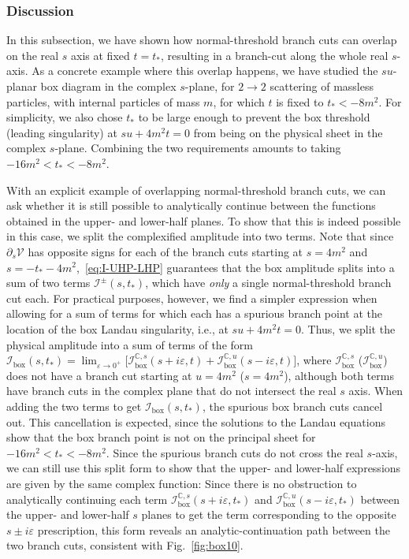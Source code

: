 \documentclass[12pt]{article}
\numberwithin{figure}{section}
\def \C {\mathbb{C}}
\def \eps {\varepsilon}
\def \V {\mathcal{V}}
\def \I {\mathcal{I}}
\def \boxx {\mathrm{box}}
\begin{document}
    \subsubsection{Discussion}
	
	In this subsection, we have shown how normal-threshold branch cuts can overlap on the real $s$ axis at fixed $t=t_\ast$, resulting in a branch-cut along the whole real $s$-axis. As a concrete example where this overlap happens, we have studied the $su$-planar box diagram in the complex $s$-plane, for $2 \to 2$ scattering of massless particles, with internal particles of mass $m$, for which $t$ is fixed to $t_\ast<- 8 m^2$. For simplicity, we also chose $t_\ast$ to be large enough to prevent the box threshold (leading singularity) at $s u + 4m^2 t = 0$ from being on the physical sheet in the complex $s$-plane. Combining the two requirements amounts to taking $-16 m^2 < t_\ast < -8 m^2$.
	
	With an explicit example of overlapping normal-threshold branch cuts, we can ask whether it is still possible to analytically continue between the functions obtained in the upper- and lower-half planes. To show that this is indeed possible in this case, we split the complexified amplitude into two terms. Note that since $\partial_s \V$ has opposite signs for each of the branch cuts starting at $s=4 m^2$ and $s=-t_\ast - 4 m^2$,~\eqref{eq:I-UHP-LHP} guarantees that the box amplitude splits into a sum of two terms $\I^\pm (s,t_\ast)$, which have \textit{only} a single normal-threshold branch cut each. For practical purposes, however, we find a simpler expression when allowing for a sum of terms for which each has a spurious branch point at the location of the box Landau singularity, i.e., at $s u + 4m^2 t = 0$. Thus, we split the physical amplitude into a sum of terms of the form $\I_\boxx (s,t_\ast) = \lim_{\varepsilon\to 0^+} \!\big[ \I_\boxx^{\C,s} (s+i\varepsilon,t) + \I_\boxx^{\C,u} (s-i\varepsilon,t) \big]$, where $\I_\boxx^{\C,s}$ ($\I_\boxx^{\C,u}$) does not have a branch cut starting at $u=4 m^2$ ($s=4 m^2$), although both terms have branch cuts in the complex plane that do not intersect the real $s$ axis. When adding the two terms to get  $\I_\boxx (s,t_\ast)$, the spurious box branch cuts cancel out. This cancellation is expected, since the solutions to the Landau equations show that the box branch point is not on the principal sheet for $-16 m^2 < t_\ast < -8 m^2$. Since the spurious branch cuts do not cross the real $s$-axis, we can still use this split form to show that the upper- and lower-half expressions are given by the same complex function: Since there is no obstruction to analytically continuing each term $\I_\boxx^{\C,s}(s + i \varepsilon,t_\ast)$ and $\I_\boxx^{\C,u}(s - i \varepsilon,t_\ast)$ between the upper- and lower-half $s$ planes to get the term corresponding to the opposite $s \pm i \eps$ prescription, this form reveals an analytic-continuation path between the two branch cuts, consistent with Fig.~\ref{fig:box10}. 
	
\end{document}
